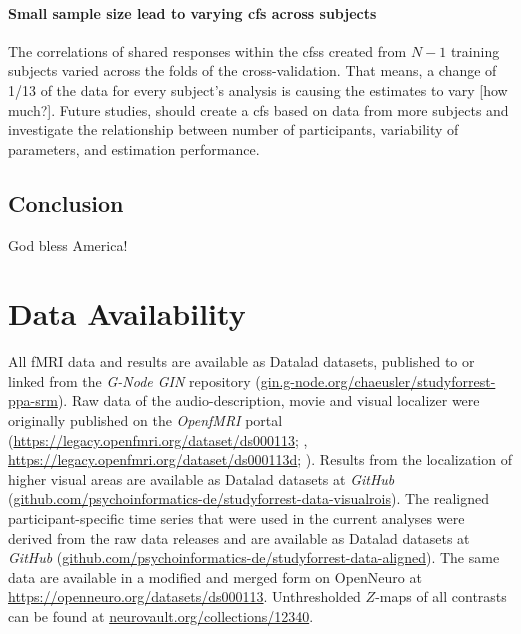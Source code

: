 \paragraph{Small sample size lead to varying \ac{cfs} across subjects}


The correlations of shared responses within the \acp{cfs} created from $N-1$
training subjects varied across the folds of the cross-validation.
That means, a change of 1/13 of the data for every subject's analysis is causing
the estimates to vary [how much?].
Future studies, should create a \ac{cfs} based on data from more subjects and
investigate the relationship between number of participants, variability of
parameters, and estimation performance.


\subsection{Conclusion}

God bless America!


\section{Data Availability}



All fMRI data and results are available as Datalad \citep{halchenko2021datalad}
datasets, published to or linked from the \emph{G-Node GIN} repository
(\href{https://gin.g-node.org/chaeusler/studyforrest-ppa-srm}{\url{gin.g-node.org/chaeusler/studyforrest-ppa-srm}}).
Raw data of the audio-description, movie and visual localizer were originally
published on the \emph{OpenfMRI} portal
(\url{https://legacy.openfmri.org/dataset/ds000113}; \citep{Hanke2014ds000113},
\space \url{https://legacy.openfmri.org/dataset/ds000113d};
\citep{hanke2016ds000113d}).
Results from the localization of higher visual areas are available as Datalad
datasets at \emph{GitHub}
(\href{https://github.com/psychoinformatics-de/studyforrest-data-visualrois}{\url{github.com/psychoinformatics-de/studyforrest-data-visualrois}}).
The realigned participant-specific time series that were used in the current
analyses were derived from the raw data releases and are available as Datalad
datasets at \emph{GitHub}
(\href{https://github.com/psychoinformatics-de/studyforrest-data-aligned}{\url{github.com/psychoinformatics-de/studyforrest-data-aligned}}).
The same data are available in a modified and merged form on OpenNeuro at
\url{https://openneuro.org/datasets/ds000113}.
Unthresholded $Z$-maps of all contrasts can be found at
\href{https://identifiers.org/neurovault.collection:12340}{\url{neurovault.org/collections/12340}}.


